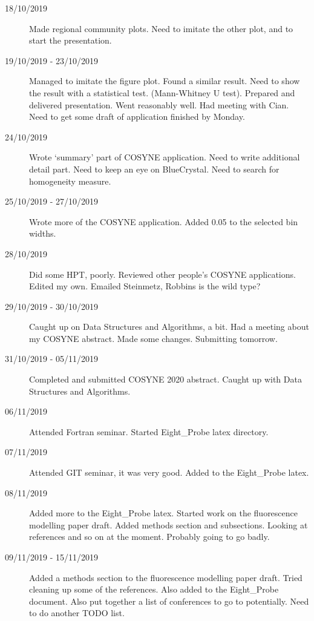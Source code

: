 \documentclass[a4paper,12pt]{article}
\theoremstyle{definition}
\begin{document}
\begin{description}
	\item[18/10/2019] Made regional community plots. Need to imitate the other plot, and to start the presentation.

	\item[19/10/2019 - 23/10/2019] Managed to imitate the figure plot. Found a similar result. Need to show the result with a statistical test. (Mann-Whitney U test). Prepared and delivered presentation. Went reasonably well. Had meeting with Cian. Need to get some draft of application finished by Monday.

	\item[24/10/2019] Wrote `summary' part of COSYNE application. Need to write additional detail part. Need to keep an eye on BlueCrystal. Need to search for homogeneity measure.

	\item[25/10/2019 - 27/10/2019] Wrote more of the COSYNE application. Added 0.05 to the selected bin widths.

	\item[28/10/2019] Did some HPT, poorly. Reviewed other people's COSYNE applications. Edited my own. Emailed Steinmetz, Robbins is the wild type?

	\item[29/10/2019 - 30/10/2019] Caught up on Data Structures and Algorithms, a bit. Had a meeting about my COSYNE abstract. Made some changes. Submitting tomorrow.

	\item[31/10/2019 - 05/11/2019] Completed and submitted COSYNE 2020 abstract. Caught up with Data Structures and Algorithms.

	\item[06/11/2019] Attended Fortran seminar. Started Eight\_Probe latex directory.

	\item[07/11/2019] Attended GIT seminar, it was very good. Added to the Eight\_Probe latex.

	\item[08/11/2019] Added more to the Eight\_Probe latex. Started work on the fluorescence modelling paper draft. Added methods section and subsections. Looking at references and so on at the moment. Probably going to go badly.

	\item[09/11/2019 - 15/11/2019] Added a methods section to the fluorescence modelling paper draft. Tried cleaning up some of the references. Also added to the Eight\_Probe document. Also put together a list of conferences to go to potentially. Need to do another TODO list.


\end{description}
\end{document}
